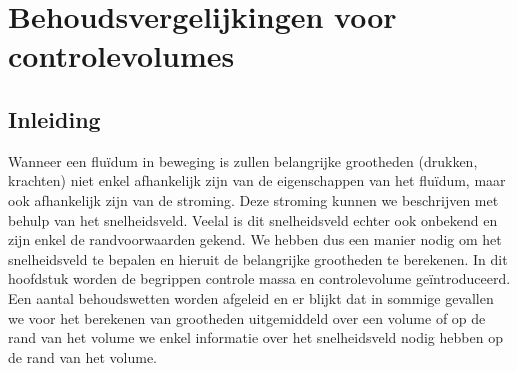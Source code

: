\FloatBarrier
\chapter{Behoudsvergelijkingen voor controlevolumes}
\label{sec:Behoudsvergelijkingen voor controlevolumes}

	\FloatBarrier
	\section{Inleiding}
	\label{sec:Controlevolume benadering Inleiding}
Wanneer een flu\"idum in beweging is zullen belangrijke grootheden (drukken, krachten) niet enkel afhankelijk zijn van de eigenschappen van het flu\"idum, maar ook afhankelijk zijn van de stroming. Deze stroming kunnen we beschrijven met behulp van het snelheidsveld. Veelal is dit snelheidsveld echter ook onbekend en zijn enkel de randvoorwaarden gekend. We hebben dus een manier nodig om het snelheidsveld te bepalen en hieruit de belangrijke grootheden te berekenen.
\npar
In dit hoofdstuk worden de begrippen controle massa en controlevolume ge\"introduceerd. Een aantal behoudswetten worden afgeleid en er blijkt dat in sommige gevallen we voor het berekenen van grootheden uitgemiddeld over een volume of op de rand van het volume we enkel informatie over het snelheidsveld nodig hebben op de rand van het volume.

	\FloatBarrier
